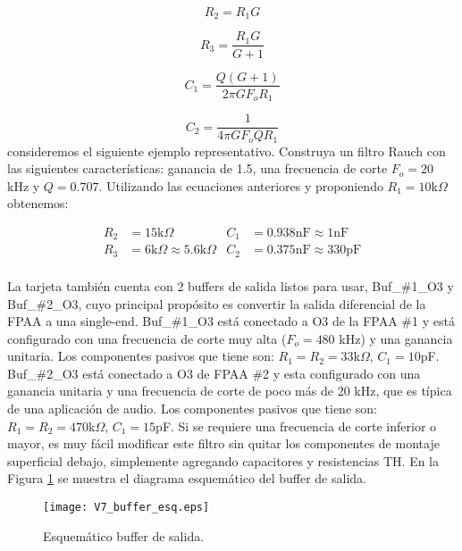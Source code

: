 	\begin{equation}
		R_{2} = R_{1} G
	\end{equation}
	
	\begin{equation}
		R_{3} = \frac{R_{1} G}{G + 1}
	\end{equation}
	
	\begin{equation}
		C_{1} = \frac{Q (G + 1)}{2 \pi G F_{o} R_{1}}
	\end{equation}
	
	\begin{equation}
		C_{2} = \frac{1}{4 \pi G F_{o} Q R_{1}}
	\end{equation}
	consideremos el siguiente ejemplo representativo. Construya un filtro Rauch con las siguientes características: ganancia de 1.5, una frecuencia de corte $F_{o} = 20$ kHz y $Q = 0.707$. Utilizando las ecuaciones anteriores y proponiendo $R_{1} = 10$k$\Omega$ obtenemos:
	
	\vspace{-1cm}
	\begin{align*}
		R_{2}	&=	15\mathrm{k}\Omega		& C_{1}	&=	0.938\mathrm{nF} \approx	1\mathrm{nF}\\
		R_{3}	&=	6\mathrm{k}\Omega \approx	5.6\mathrm{k}\Omega		& C_{2}	&=	0.375\mathrm{nF} \approx	330\mathrm{pF}\\
	\end{align*}	
	
	\vspace{-1cm}
	La tarjeta también cuenta con 2 buffers de salida listos para usar, Buf\_\#1\_O3 y Buf\_\#2\_O3, cuyo principal propósito es convertir la salida diferencial de la FPAA a una single-end. 
	Buf\_\#1\_O3 está conectado a O3 de la FPAA \#1 y está configurado con una frecuencia de corte muy alta ($F_{o} = 480$ kHz) y una ganancia unitaria. Los componentes pasivos que tiene son: $R_{1} = R_{2} = 33$k$\Omega$, $C_{1} = 10$pF. Buf\_\#2\_O3 está conectado a O3 de FPAA \#2 y esta configurado con una ganancia unitaria y una frecuencia de corte de poco más de 20 kHz, que es típica de una aplicación de audio. Los componentes pasivos que tiene son: $R_{1} = R_{2} = 470$k$\Omega$, $C_{1} = 15$pF. Si se requiere una frecuencia de corte inferior o mayor, es muy fácil modificar este filtro sin quitar los componentes de montaje superficial debajo, simplemente agregando capacitores y resistencias TH. En la Figura \ref{fig:V7_buffer_esq} se muestra el diagrama esquemático del buffer de salida.
	\begin{figure}[!hbp] 
		\caption{Esquemático buffer de salida.}
		\label{fig:V7_buffer_esq}
		\centering
		\texttt{[image: V7\_buffer\_esq.eps]}
	\end{figure}
	
